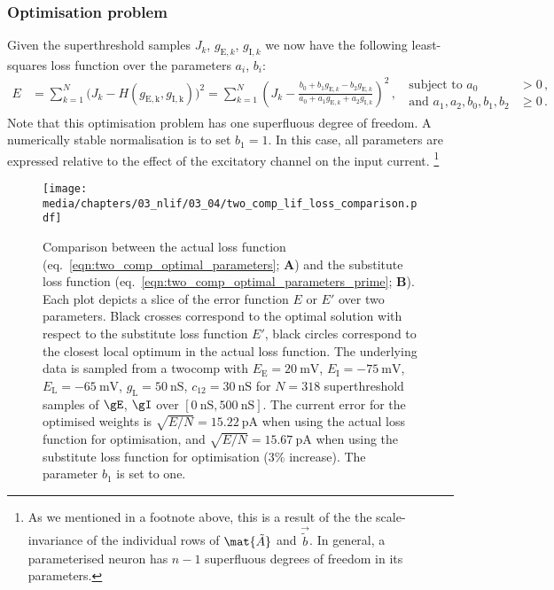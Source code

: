 \subsubsection{Optimisation problem}
Given the superthreshold samples $J_k$, $g_{\mathrm{E}, k}$, $g_{\mathrm{I}, k}$ we now have the following least-squares loss function over the parameters $a_i$, $b_i$:
\begin{align}
	E &=
		\sum_{k = 1}^N \bigl( J_k - H(g_\mathrm{E, k}, g_\mathrm{I, k}) \bigr)^2
	= \sum_{k = 1}^N \left( \! J_k - \frac{b_0 + b_1 g_{\mathrm{E}, k} - b_2 g_{\mathrm{E}, k}}{a_0 + a_1 g_{\mathrm{E}, k} + a_2  g_{\mathrm{I}, k}} \right)^2 \,,
	\;\; \begin{aligned}\text{subject to } a_0 &> 0 \,, \\ \text{and } a_1, a_2, b_0, b_1, b_2 &\geq  0 \,.\end{aligned}
	\label{eqn:two_comp_optimal_parameters}
\end{align}
Note that this optimisation problem has one superfluous degree of freedom.
A numerically stable normalisation is to set $b_1 = 1$.
In this case, all parameters are expressed relative to the effect of the excitatory channel on the input current.%
\footnote{As we mentioned in a footnote above, this is a result of the the scale-invariance of the individual rows of $\mat{\tilde A}$ and $\vec{\tilde b}$. In general, a parameterised \nlif neuron has $n - 1$ superfluous degrees of freedom in its parameters.}

\begin{figure}
	\centering
	\texttt{[image: media/chapters/03\_nlif/03\_04/two\_comp\_lif\_loss\_comparison.pdf]}
	\caption[Comparison between the actual and substitute loss function.]{Comparison between the actual loss function (eq.~\ref{eqn:two_comp_optimal_parameters}; \textbf{A}) and the substitute loss function (eq.~\ref{eqn:two_comp_optimal_parameters_prime}; \textbf{B}).
	Each plot depicts a slice of the error function $E$ or $E'$ over two parameters.
	Black crosses correspond to the optimal solution with respect to the substitute loss function $E'$, black circles correspond to the closest local optimum in the actual loss function.
	The underlying data is sampled from a \gls{twocomp} with  $E_\mathrm{E} = \SI{20}{\milli\volt}$, $E_\mathrm{I} = \SI{-75}{\milli\volt}$, $E_\mathrm{L} = \SI{-65}{\milli\volt}$, $g_\mathrm{L} = \SI{50}{\nano\siemens}$, $c_{12} =\SI{30}{\nano\siemens}$ for $N = 318$ superthreshold samples of $\gE$, $\gI$ over $[\SI{0}{\nano\siemens}, \SI{500}{\nano\siemens}]$.
	The \RMSE current error for the optimised weights is $\sqrt{E/N} = \SI{15.22}{\pico\ampere}$ when using the actual loss function for optimisation, and $\sqrt{E/N} = \SI{15.67}{\pico\ampere}$ when using the substitute loss function for optimisation ($3\%$ increase). The parameter $b_1$ is set to one.
	}
	\label{fig:two_comp_lif_loss_comparison}
\end{figure}

